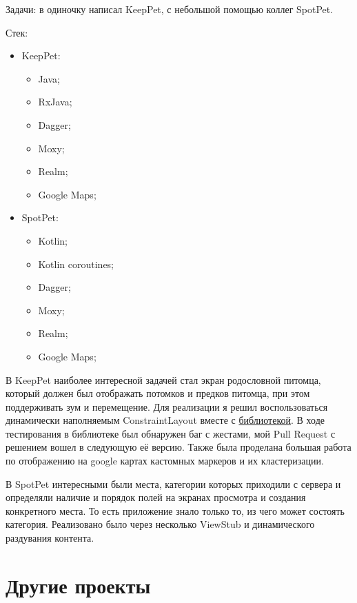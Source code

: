 \documentclass[a4paper,12pt]{article}
\begin{document}
    Задачи: в одиночку написал KeepPet, с небольшой помощью коллег SpotPet.

    Стек:
    \begin{itemize}
        \item KeepPet:
            \begin{itemize}
                \item Java;
                \item RxJava;
                \item Dagger;
                \item Moxy;
                \item Realm;
                \item Google Maps;
            \end{itemize}
        \item SpotPet:
            \begin{itemize}
                \item Kotlin;
                \item Kotlin coroutines;
                \item Dagger;
                \item Moxy;
                \item Realm;
                \item Google Maps;
            \end{itemize}
    \end{itemize}
    
    В KeepPet наиболее интересной задачей стал экран родословной питомца, который должен был отображать потомков и предков питомца, при этом поддерживать зум и перемещение. Для реализации я решил воспользоваться динамически наполняемым ConstraintLayout вместе с \href{https://github.com/natario1/ZoomLayout}{библиотекой}. В ходе тестирования в библиотеке был обнаружен баг с жестами, мой Pull Request с решением вошел в следующую её версию. Также была проделана большая работа по отображению на google картах  кастомных маркеров и их кластеризации.
    
    В SpotPet интересными были места, категории которых приходили с сервера и определяли наличие и порядок полей на экранах просмотра и создания конкретного места. То есть приложение знало только то, из чего может состоять категория. Реализовано было через несколько ViewStub и динамического раздувания контента.

    \section*{Другие проекты}
\end{document}
